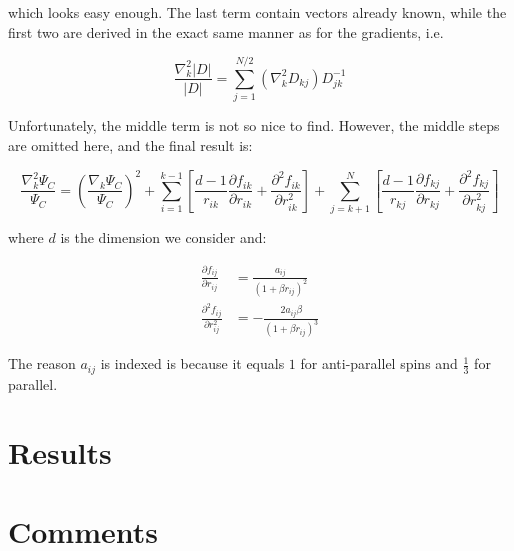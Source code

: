 \documentclass[english, a4paper]{article}
\begin{document}
which looks easy enough. The last term contain vectors already known, while the first two are derived in the exact same manner as for the gradients, i.e.

\begin{equation}
	\frac{\nabla_k^2|D|}{|D|} = \sum_{j=1}^{N/2}(\nabla_k^2D_{kj})D_{jk}^{-1}
\end{equation}

Unfortunately, the middle term is not so nice to find. However, the middle steps are omitted here, and the final result is:

\begin{equation}
	\frac{\nabla_k^2 \Psi_C}{\Psi_C} = \left(\frac{\nabla_k\Psi_C}{\Psi_C}\right)^2 + \sum_{i=1}^{k-1}\left[\frac{d-1}{r_{ik}}\frac{\partial f_{ik}}{\partial r_{ik}} + \frac{\partial^2 f_{ik}}{\partial r_{ik}^2}\right] + \sum_{j=k+1}^{N}\left[\frac{d-1}{r_{kj}}\frac{\partial f_{kj}}{\partial r_{kj}} + \frac{\partial^2 f_{kj}}{\partial r_{kj}^2}\right]
\end{equation}

where $d$ is the dimension we consider and:

\begin{align}
	\frac{\partial f_{ij}}{\partial r_{ij}} &= \frac{a_{ij}}{(1+\beta r_{ij})^2}\\
	\frac{\partial^2 f_{ij}}{\partial r_{ij}^2} &= -\frac{2a_{ij}\beta}{(1+\beta r_{ij})^3}
\end{align}

The reason $a_{ij}$ is indexed is because it equals $1$ for anti-parallel spins and $\frac{1}{3}$ for parallel.

\section{Results}


\section{Comments}
\end{document}
